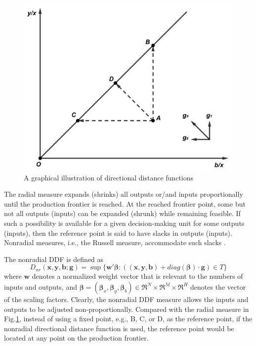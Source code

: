\begin{figure}[ht]
    \centering
    \includegraphics[scale=0.5]{SJF1.pdf}
    \caption{A graphical illustration of directional distance functions} 
    \label{fig_ddf}
\end{figure}

The radial measure expands (shrinks) all outputs or/and inputs proportionally until the production frontier is reached. At the reached frontier point, some but not all outputs (inputs) can be expanded (shrunk) while remaining feasible. If such a possibility is available for a given decision-making unit for some outputs (inputs), then the reference point is said to have slacks in outputs (inputs). Nonradial measures, i.e., the Russell measure, accommodate such slacks \citep{Chambers2002,Fare2010,Zhou2012}.

The nonradial DDF is defined as
\begin{equation}\label{eq_ddf_nr}
    D_{nr} (\pmb{x},\pmb{y},\pmb{b};\pmb{g}) = \sup \{ \pmb{w'} \pmb{\beta} :((\pmb{x},\pmb{y},\pmb{b}) + \textit{diag}(\pmb{\beta}) \cdot \pmb{g}) \in T \} 
\end{equation}
where $\pmb{w}$ denotes a normalized weight vector that is relevant to the numbers of inputs and outputs, and ${\pmb{\beta }} = ({{\pmb{\beta }}_x},{{\pmb{\beta }}_y},{{\pmb{\beta }}_b}) \in {\Re ^N} \times {\Re ^M} \times {\Re ^H}$ denotes the vector of the scaling factors. 
Clearly, the nonradial DDF measure allows the inputs and outputs to be adjusted non-proportionally. Compared with the radial measure in Fig.\ref{fig_ddf}, instead of using a fixed point, e.g., B, C, or D, as the reference point, if the nonradial directional distance function is used, the reference point would be located at any point on the production frontier.
 

